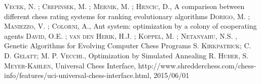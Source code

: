 \documentclass[pdftex]{article}
\begin{document}
\begin{thebibliography}{99}

 \textsc{Vecek, N. ; Crepinsek, M. ; Mernik, M. ; Hrncic, D.}, A comparison between different chess rating systems for ranking evolutionary algorithms 
 \textsc{Dorigo, M. ; Maniezzo, V. ; Colorni, A.}, Ant system: optimization by a colony of cooperating agents 
 \textsc{David, O.E. ; van den Herik, H.J. ; Koppel, M. ; Netanyahu, N.S. }, Genetic Algorithms for Evolving Computer Chess Programs 
 \textsc{S. Kirkpatrick; C. D. Gelatt; M. P. Vecchi.}, Optimization by Simulated Annealing 
 \textsc{R. Huber, S. Meyer-Kahlen}, Universal Chess Interface, http://www.shredderchess.com/chess-info/features/uci-universal-chess-interface.html, 2015/06/01

\end{thebibliography}
\end{document}
